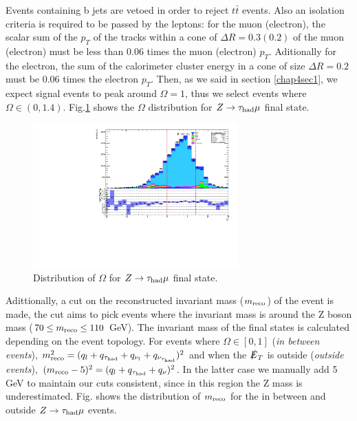 Events containing b jets are vetoed in order to reject $t\bar{t}$ events. Also an isolation criteria is required to be passed by the leptons: for the muon (electron), the scalar sum of the $p_T$ of the tracks within a cone of $\Delta R=0.3 (0.2)$ of the muon (electron) must be less than 0.06 times the muon (electron) $p_T$. Aditionally for the electron, the sum of the calorimeter cluster energy in a cone of size $\Delta R=0.2$ must be 0.06 times the electron $p_T$.  Then, as we said in section \ref{chap4sec1}, we expect signal events to peak around $\Omega=1$, thus we select events where $\Omega\in (0,1.4)$. Fig.\ref{Fig9} shows the $\Omega$ distribution for $Z\to\tau_\text{had}\mu$ final state.
\begin{figure}[h]
	\centering
	\includegraphics[width=0.7\textwidth]{figures/Fig9}
	\caption{Distribution of $\Omega$ for $Z\to\tau_\text{had}\mu$ final state. }
	\label{Fig9}
\end{figure}
Adittionally, a cut on the reconstructed invariant mass ($m_{\text{reco}}$) of the event is made, the cut aims to pick events where the invariant mass is around the Z boson mass ($70\leq m_{\text{reco}}\leq 110$ GeV). The invariant mass of the final states is calculated depending on the event topology. For events where $\Omega\in [0,1]$ (\textit{in between events}),  $m_{\text{reco}}^{2}=(q_l+q_{\tau_\text{had}}+q_{\nu_l}+q_{\nu_{\tau_\text{had}}})^2$ and when the $\slashed{E}_T$ is outside (\textit{outside events}), $(m_{\text{reco}}-5)^{2}=(q_l+q_{\tau_\text{had}}+q_\nu)^2$. In the latter case we manually add 5 GeV to maintain our cuts consistent, since in this region the Z mass is underestimated. Fig. shows the distribution of $m_{\text{reco}}$ for the in between and outside $Z\to\tau_\text{had}\mu$ events. 
